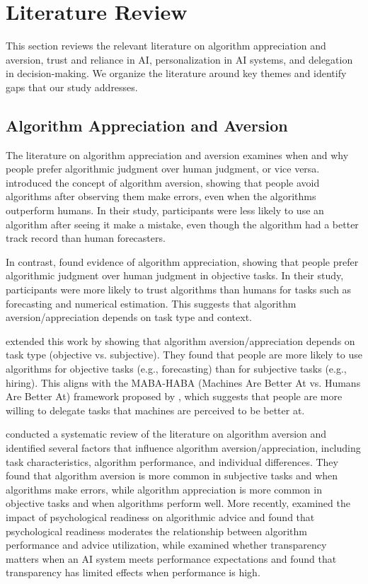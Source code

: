 \section{Literature Review}
\label{sec:literature}

This section reviews the relevant literature on algorithm appreciation and aversion, trust and reliance in AI, personalization in AI systems, and delegation in decision-making. We organize the literature around key themes and identify gaps that our study addresses.

\subsection{Algorithm Appreciation and Aversion}

The literature on algorithm appreciation and aversion examines when and why people prefer algorithmic judgment over human judgment, or vice versa. \citet{dietvorst2015} introduced the concept of algorithm aversion, showing that people avoid algorithms after observing them make errors, even when the algorithms outperform humans. In their study, participants were less likely to use an algorithm after seeing it make a mistake, even though the algorithm had a better track record than human forecasters.

In contrast, \citet{logg2019} found evidence of algorithm appreciation, showing that people prefer algorithmic judgment over human judgment in objective tasks. In their study, participants were more likely to trust algorithms than humans for tasks such as forecasting and numerical estimation. This suggests that algorithm aversion/appreciation depends on task type and context.

\citet{castelo2019} extended this work by showing that algorithm aversion/appreciation depends on task type (objective vs. subjective). They found that people are more likely to use algorithms for objective tasks (e.g., forecasting) than for subjective tasks (e.g., hiring). This aligns with the MABA-HABA (Machines Are Better At vs. Humans Are Better At) framework proposed by \citet{glikson2020}, which suggests that people are more willing to delegate tasks that machines are perceived to be better at.

\citet{mahmud2022} conducted a systematic review of the literature on algorithm aversion and identified several factors that influence algorithm aversion/appreciation, including task characteristics, algorithm performance, and individual differences. They found that algorithm aversion is more common in subjective tasks and when algorithms make errors, while algorithm appreciation is more common in objective tasks and when algorithms perform well. More recently, \citet{kim2026} examined the impact of psychological readiness on algorithmic advice and found that psychological readiness moderates the relationship between algorithm performance and advice utilization, while \citet{sun2026} examined whether transparency matters when an AI system meets performance expectations and found that transparency has limited effects when performance is high.

